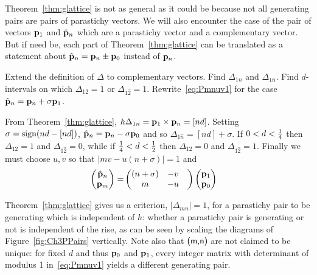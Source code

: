 Theorem~\ref{thm:glattice} is not as general as it could be because not all generating pairs are pairs of parastichy vectors. We will also encounter the case of the pair of vectors 
${\mathbf p}_{1}$ and $\hat{\mathbf p}_{n}$ which are a parastichy vector and a complementary vector. But if need be, each part of Theorem~\ref{thm:glattice} can be translated as a statement about $\hat{\mathbf p}_{n}={\mathbf p}_{n}\pm{\mathbf p}_{0}$ instead of ${\mathbf p}_{n}$. 

\begin{jExercise}
Extend the definition of $\Delta$ to complementary vectors. 	Find   $\Delta_{1n}$ and $\Delta_{1\hat n}$. Find  $d$-intervals on which 
$\Delta_{12}=1$ or $\Delta_{1\hat 2}=1$. Rewrite~\eqref{eq:Pmnuv1} for the case $\hat{\mathbf p}_{n}={\mathbf p}_{n}+\sigma{\mathbf p}_{1}$.
\label{ex:calcdelta}
\end{jExercise}
\begin{jAnswer}
From Theorem~\ref{thm:glattice}, $h\Delta_{1n}={\mathbf p}_{1}\times{\mathbf p}_{n}=[nd]$.
Setting $\sigma=\mathrm{sign} (nd -[nd])$, $\hat{\mathbf p}_{n}={\mathbf p}_{n}-\sigma{\mathbf p}_{0}$ and so $\Delta_{1\hat n}=[nd]+\sigma$. 
If $0<d<\textstyle{\frac{1}{4}}$ then $\Delta_{12}=1$ and $\Delta_{1\hat2}=0$, while 
if  $\textstyle{\frac{1}{4}}<d<\textstyle{\frac{1}{2}}$ then  $\Delta_{12}=0$ and $\Delta_{1\hat2}=1$.
Finally we must choose $u,v$ so that $|mv -u(n+\sigma)|=1$ and
		\begin{align}\label{eq:Pmnuv1ex}
		\begin{pmatrix}
			\hat{\mathbf p}_{n} \\ {\mathbf p}_{m} 
		\end{pmatrix} = &
		\begin{pmatrix}
			(n+\sigma)  & - v 
			\\
			m &- u &
		\end{pmatrix}
		\begin{pmatrix}
			{\mathbf p}_{1}
			\\
			{\mathbf p}_{0}
		\end{pmatrix}
	\end{align}
\end{jAnswer}

Theorem~\ref{thm:glattice} gives us a criterion, $|\Delta_{mn}|=1$, for a parastichy pair to be generating which is independent of $h$: whether a parastichy pair is generating or not is independent of the rise, as can be seen by scaling the diagrams of Figure~\ref{fig:Ch3PPairs} vertically.  Note also that $\textsf{(m,n)}$ are not claimed to be unique: for fixed $d$ and thus ${\mathbf p}_{0}$ and ${\mathbf p}_{1}$, every integer matrix with determinant of modulus 1 in~\eqref{eq:Pmnuv1} yields a different generating pair.


